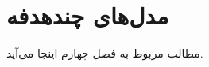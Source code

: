 \chapter{مدل‌های چندهدفه}\label{Models}

مطالب مربوط به فصل چهارم اینجا می‌آید.















































